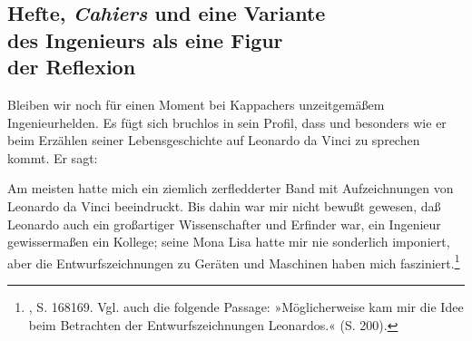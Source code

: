 \documentclass[%
	fontsize=10pt,%
	twoside,%
	headings=optiontoheadandtoc,%
	showtrims]{scrbook}
\renewenvironment{quote}{%
  \addmargin[\genericindent]{0pt}%
  \KOMAoptions{parskip=true}%
  \ifdim\parskip>0pt\else\addvspace{\intextsep}\fi
}{%
  \par
  \endaddmargin\vspace{\intextsep}
}
\begin{document}
\subsection[Hefte, \emph{Cahiers} \textendash{} und eine Variante    des Ingenieurs als eine Figur    der Reflexion]{Hefte, \emph{Cahiers} \textendash{} und eine Variante \- \protect\\ des Ingenieurs als eine Figur \- \protect\\ der Reflexion}
\par Bleiben wir noch für einen Moment bei Kappachers unzeitgemäßem Ingenieurhelden. Es fügt sich bruchlos in sein Profil, dass \textendash{} und besonders wie \textendash{} er beim Erzählen seiner Lebensgeschichte auf Leonardo da Vinci zu sprechen kommt. Er sagt:\begin{quote}
\par Am meisten hatte mich ein ziemlich zerfledderter Band mit Aufzeichnungen von Leonardo da Vinci beeindruckt. Bis dahin war mir nicht bewußt gewesen, daß Leonardo auch ein großartiger Wissenschafter und Erfinder war, ein Ingenieur gewissermaßen ein Kollege; seine Mona Lisa hatte mir nie sonderlich imponiert, aber die Entwurfszeichnungen zu Geräten und Maschinen haben mich fasziniert.\footnote{\cite[][]{kappacher2000a}, S. 168\textendash{}169. Vgl. auch die folgende Passage: »Möglicherweise kam mir die Idee beim Betrachten der Entwurfszeichnungen Leonardos.« (S. 200).} 
\end{quote}
\end{document}

